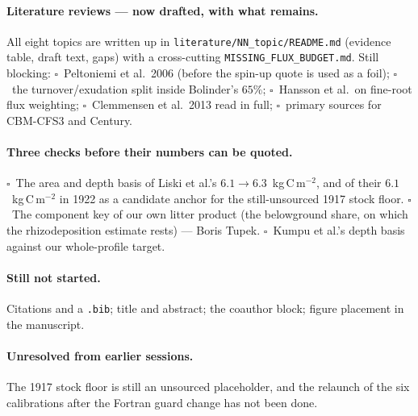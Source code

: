 \documentclass[11pt]{article}
\newcommand{\nd}{\textcolor{lorrule}{$\square$}}
\begin{document}
\paragraph{Literature reviews --- now drafted, with what remains.} All eight topics are written up in
\texttt{literature/NN\_topic/README.md} (evidence table, draft text, gaps) with a cross-cutting
\texttt{MISSING\_FLUX\_BUDGET.md}. Still blocking: \nd~Peltoniemi et al.~2006 (before the spin-up quote
is used as a foil); \nd~the turnover/exudation split inside Bolinder's $65\%$; \nd~Hansson et al.\ on
fine-root flux weighting; \nd~Clemmensen et al.~2013 read in full; \nd~primary sources for CBM-CFS3 and
Century.

\paragraph{Three checks before their numbers can be quoted.} \nd~The area and depth basis of Liski et
al.'s $6.1\to6.3$~kg\,C\,m$^{-2}$, and of their $6.1$~kg\,C\,m$^{-2}$ in 1922 as a candidate anchor for
the still-unsourced 1917 stock floor. \nd~The component key of our own litter product (the belowground
share, on which the rhizodeposition estimate rests) --- Boris Tupek. \nd~Kumpu et al.'s depth basis
against our whole-profile target.

\paragraph{Still not started.} Citations and a \texttt{.bib}; title and abstract; the coauthor block;
figure placement in the manuscript.

\paragraph{Unresolved from earlier sessions.} The 1917 stock floor is still an unsourced placeholder,
and the relaunch of the six calibrations after the Fortran guard change has not been done.
\end{document}
